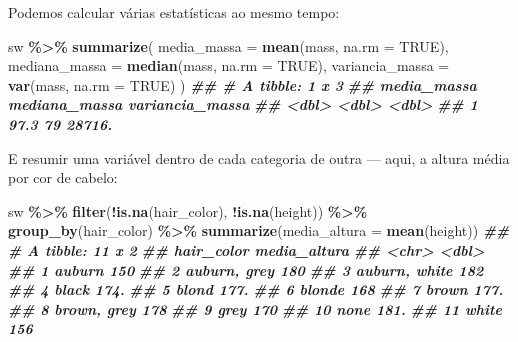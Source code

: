 \documentclass[
  portuguese,
  11pt,
  openany]{book}
\newenvironment{Shaded}{\begin{snugshade}}{\end{snugshade}}
\newcommand{\AttributeTok}[1]{\textcolor[rgb]{0.13,0.29,0.53}{#1}}
\newcommand{\ConstantTok}[1]{\textcolor[rgb]{0.56,0.35,0.01}{#1}}
\newcommand{\DocumentationTok}[1]{\textcolor[rgb]{0.56,0.35,0.01}{\textbf{\textit{#1}}}}
\newcommand{\FunctionTok}[1]{\textcolor[rgb]{0.13,0.29,0.53}{\textbf{#1}}}
\newcommand{\NormalTok}[1]{#1}
\newcommand{\SpecialCharTok}[1]{\textcolor[rgb]{0.81,0.36,0.00}{\textbf{#1}}}
\newcounter{none} %
\begin{document}
Podemos calcular várias estatísticas ao mesmo tempo:

\begin{Shaded}
\begin{Highlighting}[]
\NormalTok{sw }\SpecialCharTok{\%\textgreater{}\%} \FunctionTok{summarize}\NormalTok{(}
  \AttributeTok{media\_massa     =} \FunctionTok{mean}\NormalTok{(mass, }\AttributeTok{na.rm =} \ConstantTok{TRUE}\NormalTok{),}
  \AttributeTok{mediana\_massa   =} \FunctionTok{median}\NormalTok{(mass, }\AttributeTok{na.rm =} \ConstantTok{TRUE}\NormalTok{),}
  \AttributeTok{variancia\_massa =} \FunctionTok{var}\NormalTok{(mass, }\AttributeTok{na.rm =} \ConstantTok{TRUE}\NormalTok{)}
\NormalTok{)}
\DocumentationTok{\#\# \# A tibble: 1 x 3}
\DocumentationTok{\#\#   media\_massa mediana\_massa variancia\_massa}
\DocumentationTok{\#\#         \textless{}dbl\textgreater{}         \textless{}dbl\textgreater{}           \textless{}dbl\textgreater{}}
\DocumentationTok{\#\# 1        97.3            79          28716.}
\end{Highlighting}
\end{Shaded}

E resumir uma variável dentro de cada categoria de outra --- aqui, a altura média por cor
de cabelo:

\begin{Shaded}
\begin{Highlighting}[]
\NormalTok{sw }\SpecialCharTok{\%\textgreater{}\%}
  \FunctionTok{filter}\NormalTok{(}\SpecialCharTok{!}\FunctionTok{is.na}\NormalTok{(hair\_color), }\SpecialCharTok{!}\FunctionTok{is.na}\NormalTok{(height)) }\SpecialCharTok{\%\textgreater{}\%}
  \FunctionTok{group\_by}\NormalTok{(hair\_color) }\SpecialCharTok{\%\textgreater{}\%}
  \FunctionTok{summarize}\NormalTok{(}\AttributeTok{media\_altura =} \FunctionTok{mean}\NormalTok{(height))}
\DocumentationTok{\#\# \# A tibble: 11 x 2}
\DocumentationTok{\#\#    hair\_color    media\_altura}
\DocumentationTok{\#\#    \textless{}chr\textgreater{}                \textless{}dbl\textgreater{}}
\DocumentationTok{\#\#  1 auburn                150 }
\DocumentationTok{\#\#  2 auburn, grey          180 }
\DocumentationTok{\#\#  3 auburn, white         182 }
\DocumentationTok{\#\#  4 black                 174.}
\DocumentationTok{\#\#  5 blond                 177.}
\DocumentationTok{\#\#  6 blonde                168 }
\DocumentationTok{\#\#  7 brown                 177.}
\DocumentationTok{\#\#  8 brown, grey           178 }
\DocumentationTok{\#\#  9 grey                  170 }
\DocumentationTok{\#\# 10 none                  181.}
\DocumentationTok{\#\# 11 white                 156}
\end{Highlighting}
\end{Shaded}
\end{document}
